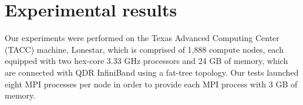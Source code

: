 \section{Experimental results}
\label{sec:experimental}
%
%
Our experiments were performed on the Texas Advanced Computing Center
(TACC) machine, Lonestar, which is comprised of 1,888 compute nodes, 
each equipped with two hex-core 3.33 GHz processors and 24 GB of memory, 
which are connected with QDR InfiniBand using a fat-tree topology. 
Our tests launched eight MPI processes per node in order to provide each MPI 
process with 3 GB of memory.


